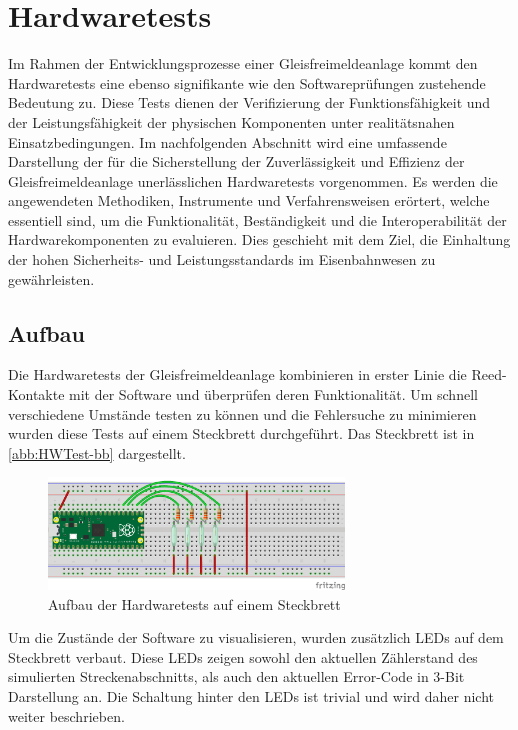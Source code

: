 \section{Hardwaretests}\label{text:Entwicklung-der-GFA:Hardwaretests}

Im Rahmen der Entwicklungsprozesse einer Gleisfreimeldeanlage kommt den Hardwaretests eine ebenso signifikante wie den Softwareprüfungen zustehende Bedeutung zu. Diese Tests dienen der Verifizierung der Funktionsfähigkeit und der Leistungsfähigkeit der physischen Komponenten unter realitätsnahen Einsatzbedingungen. Im nachfolgenden Abschnitt wird eine umfassende Darstellung der für die Sicherstellung der Zuverlässigkeit und Effizienz der Gleisfreimeldeanlage unerlässlichen Hardwaretests vorgenommen. Es werden die angewendeten Methodiken, Instrumente und Verfahrensweisen erörtert, welche essentiell sind, um die Funktionalität, Beständigkeit und die Interoperabilität der Hardwarekomponenten zu evaluieren. Dies geschieht mit dem Ziel, die Einhaltung der hohen Sicherheits- und Leistungsstandards im Eisenbahnwesen zu gewährleisten.

\subsection{Aufbau}

Die Hardwaretests der Gleisfreimeldeanlage kombinieren in erster Linie die Reed-Kontakte mit der Software und überprüfen deren Funktionalität. Um schnell verschiedene Umstände testen zu können und die Fehlersuche zu minimieren wurden diese Tests auf einem Steckbrett durchgeführt. Das Steckbrett ist in \autoref{abb:HWTest-bb} dargestellt.
\begin{figure}[H]
    \centering
    \includegraphics[width=0.7\textwidth]{Assets/Images/4-Entwicklung-der-GFA/Reed-Test_bb.png}
    \caption{Aufbau der Hardwaretests auf einem Steckbrett}
    \label{abb:HWTest-bb}
\end{figure}

Um die Zustände der Software zu visualisieren, wurden zusätzlich LEDs auf dem Steckbrett verbaut. Diese LEDs zeigen sowohl den aktuellen Zählerstand des simulierten Streckenabschnitts, als auch den aktuellen Error-Code in 3-Bit Darstellung an. Die Schaltung hinter den LEDs ist trivial und wird daher nicht weiter beschrieben.

